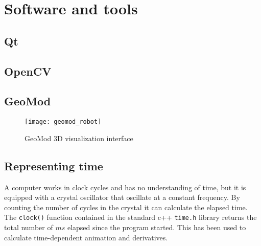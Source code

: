 \chapter{Software and tools}

\section{Qt}

\section{OpenCV}


\section{GeoMod}


\begin{figure}
 \centering 
 \texttt{[image: geomod\_robot]}
 \caption{GeoMod 3D visualization interface}
 \label{geomod_interface}
\end{figure}

\section{Representing time}

A computer works in clock cycles and has no understanding of time, but it is equipped with a crystal oscillator that oscillate at a constant frequency. By counting the number of cycles in the crystal it can calculate the elapsed time. The \texttt{clock()} function contained in the standard c++ \texttt{time.h} library returns the total number of $ms$ elapsed since the program started. This has been used to calculate time-dependent animation and derivatives.